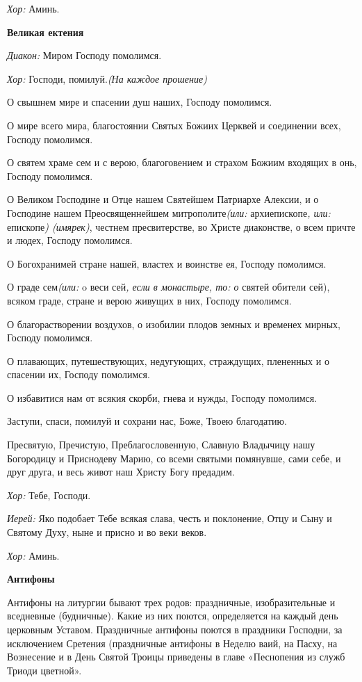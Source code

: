 {\itshape Хор:} Аминь.

{\bfseries Великая ектения}

{\itshape Диакон:} Миром Господу помолимся. 

{\itshape Хор:} Господи, помилуй.{\itshape  (На каждое прошение)}

О свышнем мире и спасении душ наших, Господу помолимся. 

О мире всего мира, благостоянии Святых Божиих Церквей и соединении всех, Господу помолимся.

О святем храме сем и с верою, благоговением и страхом Божиим входящих в онь, Господу помолимся. 

О Великом Господине и Отце нашем Святейшем Патриархе Алексии, и о Господине нашем Преосвященнейшем митрополите{\itshape  (или:} архиепископе{\itshape , или:} епископе{\itshape ) (имярек)}, честнем пресвитерстве, во Христе диаконстве, о всем причте и людех, Господу помолимся. 

О Богохранимей стране нашей, властех и воинстве ея, Господу помолимся.

О граде сем{\itshape  (или:} o веси сей{\itshape , если в монастыре, то: о} святей обители сей), всяком граде, стране и верою живущих в них, Господу помолимся. 

О благорастворении воздухов, о изобилии плодов земных и временех мирных, Господу помолимся.

О плавающих, путешествующих, недугующих, страждущих, плененных и о спасении их, Господу помолимся. 

О избавитися нам от всякия скорби, гнева и нужды, Господу помолимся. 

Заступи, спаси, помилуй и сохрани нас, Боже, Твоею благодатию. 

Пресвятую, Пречистую, Преблагословенную, Славную Владычицу нашу Богородицу и Приснодеву Марию, со всеми святыми помянувше, сами себе, и друг друга, и весь живот наш Христу Богу предадим. 

{\itshape Хор:} Тебе, Господи. 

{\itshape Иерей:} Яко подобает Тебе всякая слава, честь и поклонение, Отцу и Сыну и Святому Духу, ныне и присно и во веки веков. 

{\itshape Хор:} Аминь.

{\bfseries Антифоны}

Антифоны на литургии бывают трех родов: праздничные, изобразительные и вседневные (будничные). Какие из них поются, определяется на каждый день церковным Уставом. Праздничные антифоны поются в праздники Господни, за исключением Сретения (праздничные антифоны в Неделю ваий, на Пасху, на Вознесение и в День Святой Троицы приведены в главе «Песнопения из служб Триоди цветной».

